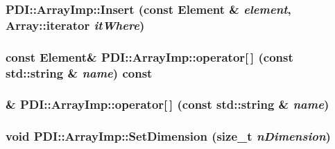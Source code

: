 \hypertarget{class_p_d_i_1_1_array_imp_ea3ee332ca946654544da5e393609c27}{
\subsubsection[{Insert}]{ PDI::ArrayImp::Insert (const {\bf Element} \& {\em element}, \/  {\bf Array::iterator} {\em itWhere})}}
\label{class_p_d_i_1_1_array_imp_ea3ee332ca946654544da5e393609c27}


\hypertarget{class_p_d_i_1_1_array_imp_1dcbc6d8fa28b3f110a0ddc4364bddba}{
\subsubsection[{operator[]}]{\setlength{\rightskip}{0pt plus 5cm}const {\bf Element}\& PDI::ArrayImp::operator\mbox{[}$\,$\mbox{]} (const std::string \& {\em name}) const}}
\label{class_p_d_i_1_1_array_imp_1dcbc6d8fa28b3f110a0ddc4364bddba}


\hypertarget{class_p_d_i_1_1_array_imp_de880158e2f8beb39a5a06dd6a999597}{
\subsubsection[{operator[]}]{\& PDI::ArrayImp::operator\mbox{[}$\,$\mbox{]} (const std::string \& {\em name})}}
\label{class_p_d_i_1_1_array_imp_de880158e2f8beb39a5a06dd6a999597}


\hypertarget{class_p_d_i_1_1_array_imp_055b671cf025fbb90934fd8ba5bc9918}{
\subsubsection[{SetDimension}]{\setlength{\rightskip}{0pt plus 5cm}void PDI::ArrayImp::SetDimension (size\_\-t {\em nDimension})}}
\label{class_p_d_i_1_1_array_imp_055b671cf025fbb90934fd8ba5bc9918}



